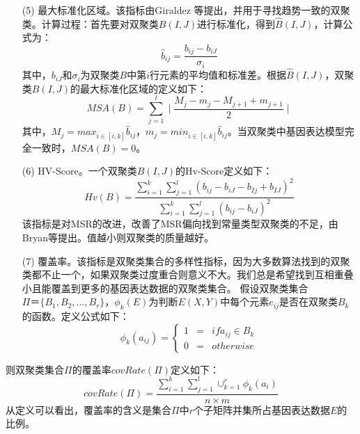 \begin{enumerate}
    \item[(5)] 最大标准化区域。该指标由Giraldez 等提出，并用于寻找趋势一致的双聚类。计算过程：首先要对双聚类$B(I,J)$进行标准化，得到$\hat{B}(I,J)$，计算公式为：
    \begin{equation}
      \hat{b}_{ij} = \frac{b_{ij}-b_{iJ}}{\sigma_i}
    \end{equation}
    \hspace{2em} 其中，$b_{iJ}$和$\sigma_i$为双聚类$B$中第$i$行元素的平均值和标准差。根据$\hat{B}(I,J)$，双聚类$B(I,J)$的最大标准化区域的定义如下：
    \begin{equation}
      MSA(B) = \sum_{j=1}^l \mid \frac{M_j-m_j-M_{j+1}+m_{j+1}}{2}\mid
    \end{equation}
    \hspace{2em} 其中，$M_j=max_{i\in [i,k]}\hat{b}_{ij}$，$m_j=min_{i\in [i,k]}\hat{b}_{ij}$。当双聚类中基因表达模型完全一致时，$MSA(B)=0$。

    \item[(6)] HV-Score。一个双聚类$B(I, J)$的Hv-Score定义如下：
    \begin{equation}
     Hv(B) = \frac{\sum_{i=1}^k \sum_{j=1}^l(b_{ij}-b_{iJ}-b_{Ij}+b_{IJ})^2}{\sum_{i=1}^k \sum_{j=1}^l(b_{ij}-b_{iJ})^2}
    \end{equation}
    该指标是对MSR的改进，改善了MSR偏向找到常量类型双聚类的不足，由Bryan等提出。值越小则双聚类的质量越好。

    \item[(7)] 覆盖率。该指标是双聚类集合的多样性指标，因为大多数算法找到的双聚类都不止一个，如果双聚类过度重合则意义不大。我们总是希望找到互相重叠小且能覆盖到更多的基因表达数据的双聚类集合。 假设双聚类集合$\Pi＝\{B_1,B_2,...,B_r\}$，$\phi_k(E)$为判断$E(X,Y)$中每个元素$e_{ij}$是否在双聚类$B_k$的函数。定义公式如下：
    \begin{equation}
    \phi_k(a_{ij})  = \left\{
      \begin{aligned}
       1 & = & if a_{ij} \in B_k \\
       0 & = & otherwise 
      \end{aligned}
    \right.
    \end{equation}
  \end{enumerate}
  \hspace{2em}则双聚类集合$\Pi$的覆盖率$covRate(\Pi)$定义如下：
  \begin{equation}
   covRate(\Pi) = \frac{\sum_{i=1}^k\sum_{j=1}^l\cup_{k=1}^r\phi_k(a_i)}{n \times m} 
  \end{equation}
  \hspace{2em}从定义可以看出，覆盖率的含义是集合$\Pi$中$r$个子矩阵并集所占基因表达数据$E$的比例。

